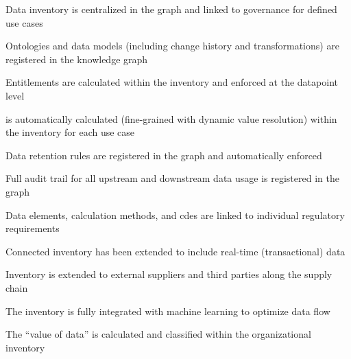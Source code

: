 \kgmmscoringlevelThree

\begin{scoring}

  \item Data inventory is centralized in the graph and linked to governance for defined use cases
  \item Ontologies and data models (including change history and transformations) are registered in the knowledge graph
  \item Entitlements are calculated within the inventory and enforced at the datapoint level
  \item {} is automatically calculated (fine-grained with dynamic value resolution) within
        the inventory for each use case
  \item Data retention rules are registered in the graph and automatically enforced
  \item Full audit trail for all upstream and downstream data usage is registered in the graph
  \item Data elements, calculation methods, and \glspl{cde} are linked to individual regulatory requirements

\end{scoring}

\kgmmscoringlevelFour

\begin{scoring}

  \item Connected inventory has been extended to include real-time (transactional) data
  \item Inventory is extended to external suppliers and third parties along the supply chain
  \item The inventory is fully integrated with machine learning to optimize data flow
  \item The “value of data” is calculated and classified within the organizational inventory

\end{scoring}


